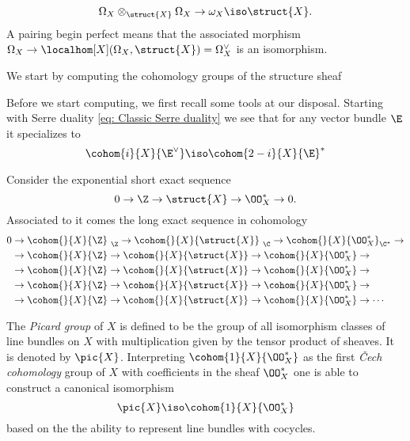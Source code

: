 





\vspace{5cm}
\[
    \Omega_X \otimes_\struct{X} \Omega_X \to \omega_X \iso \struct{X}.
\]
A pairing begin perfect means that the associated morphism $\Omega_X \to \localhom[X](\Omega_X, \struct{X}) = \Omega_X^\vee$ is an isomorphism. 


We start by computing the cohomology groups of the structure sheaf

Before we start computing, we first recall some tools at our disposal. 
Starting with Serre duality \eqref{eq: Classic Serre duality} we see that for any vector bundle $\E$ it specializes to 
\[
    \cohom{i}{X}{\E^\vee} \iso \cohom{2-i}{X}{\E}^*
\]

Consider the exponential short exact sequence
\[
    0 \to \Z \to \struct{X} \to \OO^*_X \to 0.
\]
Associated to it comes the long exact sequence in cohomology
\begin{align*}
    0 &\to \cohom{}{X}{\Z}_{\ \Z} \to \cohom{}{X}{\struct{X}}_{\ \C} \to \cohom{}{X}{\OO^*_X}_{\C^*} \to \\
    &\to \cohom{}{X}{\Z} \to \cohom{}{X}{\struct{X}} \to \cohom{}{X}{\OO^*_X} \to \\
    &\to \cohom{}{X}{\Z} \to \cohom{}{X}{\struct{X}} \to \cohom{}{X}{\OO^*_X} \to \\
    &\to \cohom{}{X}{\Z} \to \cohom{}{X}{\struct{X}} \to \cohom{}{X}{\OO^*_X} \to \\
    &\to \cohom{}{X}{\Z} \to \cohom{}{X}{\struct{X}} \to \cohom{}{X}{\OO^*_X} \to \cdots \\
\end{align*}

\newpage

The \emph{Picard group} of $X$ is defined to be the group of all isomorphism classes of line bundles on $X$ with multiplication given by the tensor product of sheaves. It is denoted by $\pic{X}$. Interpreting $\cohom{1}{X}{\OO^*_X}$ as the first \emph{Čech cohomology} group of $X$ with coefficients in the sheaf $\OO_X^*$ one is able to construct a canonical isomorphism
\[
    \pic{X} \iso \cohom{1}{X}{\OO_X^*}
\]
based on the the ability to represent line bundles with cocycles.  

